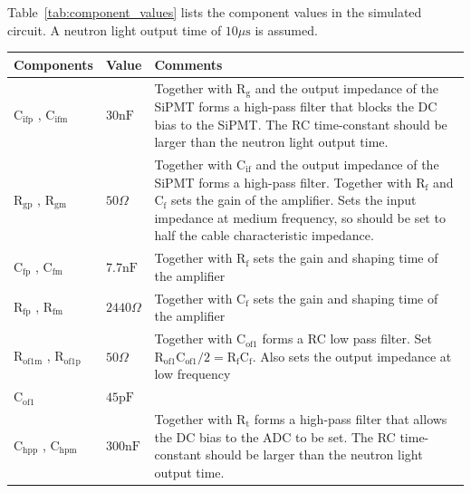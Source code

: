 \documentclass[
12pt, %
a4paper, %
oneside, %
headinclude,footinclude, %
apacite
]{scrartcl}
\begin{document}
Table~\vref{tab:component_values} lists the component values in the simulated circuit. A neutron light output time of $10\mu\mathrm{s}$ is assumed.

\begin{table}[tb]
\centering
\begin{tabularx}{\textwidth}{|l|l|X|} %
 Components & Value &  Comments \\
\toprule %

$\mathrm{C}_\mathrm{ifp}$ , $\mathrm{C}_\mathrm{ifm}$ & $30\mathrm{nF}$ & Together with $\mathrm{R}_\mathrm{g}$ and the output impedance of the SiPMT forms a high-pass filter that blocks the DC bias to the SiPMT.  The RC time-constant should be larger than the neutron light output time.\\ \midrule

$\mathrm{R}_\mathrm{gp}$ , $\mathrm{R}_\mathrm{gm}$ & $50\Omega$ & Together with $\mathrm{C}_\mathrm{if}$ and the output impedance of the SiPMT forms a high-pass filter. Together with $\mathrm{R}_\mathrm{f}$ and  $\mathrm{C}_\mathrm{f}$ sets the gain of the amplifier. Sets the input impedance at medium frequency, so should be set to half the cable characteristic impedance.\\ \midrule

$\mathrm{C}_\mathrm{fp}$ , $\mathrm{C}_\mathrm{fm}$ &  $7.7\mathrm{nF}$ & Together with $\mathrm{R}_\mathrm{f}$ sets the gain and shaping time of the amplifier  \\ \midrule

$\mathrm{R}_\mathrm{fp}$ , $\mathrm{R}_\mathrm{fm}$ &  $2440\Omega$ & Together with $\mathrm{C}_\mathrm{f}$ sets the gain and shaping time of the amplifier  \\ \midrule

$\mathrm{R}_\mathrm{of1m}$ , $\mathrm{R}_\mathrm{of1p}$ &  $50\Omega$ & Together with $\mathrm{C}_\mathrm{of1}$ forms a RC low pass filter. Set $\mathrm{R}_\mathrm{of1}\mathrm{C}_\mathrm{of1}/2 = \mathrm{R}_\mathrm{f}\mathrm{C}_\mathrm{f}$. Also sets the output impedance at low frequency \\ \midrule

$\mathrm{C}_\mathrm{of1}$  &  $45\mathrm{pF}$ &  \\ \midrule

$\mathrm{C}_\mathrm{hpp}$ , $\mathrm{C}_\mathrm{hpm}$ &  $300\mathrm{nF}$ & Together with $\mathrm{R}_\mathrm{t}$ forms a high-pass filter that allows the DC bias to the ADC to be set. The RC time-constant should be larger than the neutron light output time. \\ \midrule


\end{tabularx}
\end{table}
\end{document}
